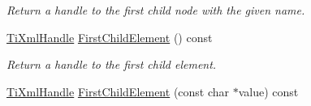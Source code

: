 \begin{DoxyCompactItemize}
\begin{DoxyCompactList}\small\item\em Return a handle to the first child node with the given name. \item\end{DoxyCompactList}\item 
\hypertarget{class_ti_xml_handle_a24d1112e995e937e4dddb202d4113d4a}{
\hyperlink{class_ti_xml_handle}{TiXmlHandle} \hyperlink{class_ti_xml_handle_a24d1112e995e937e4dddb202d4113d4a}{FirstChildElement} () const }
\label{class_ti_xml_handle_a24d1112e995e937e4dddb202d4113d4a}

\begin{DoxyCompactList}\small\item\em Return a handle to the first child element. \item\end{DoxyCompactList}\item 
\hypertarget{class_ti_xml_handle_af0aea751320f5e430fac6f8fff3b8dd4}{
\hyperlink{class_ti_xml_handle}{TiXmlHandle} \hyperlink{class_ti_xml_handle_af0aea751320f5e430fac6f8fff3b8dd4}{FirstChildElement} (const char $\ast$value) const }
\label{class_ti_xml_handle_af0aea751320f5e430fac6f8fff3b8dd4}


\end{DoxyCompactItemize}
